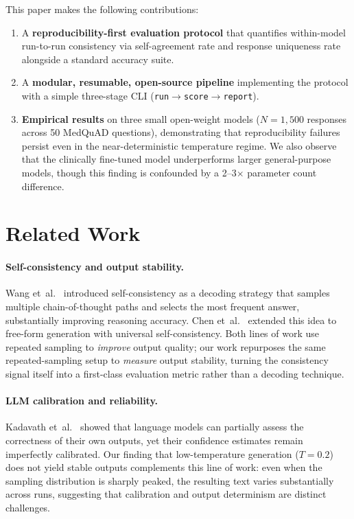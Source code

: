 \documentclass[11pt]{article}
\begin{document}
This paper makes the following contributions:
\begin{enumerate}
  \item A \textbf{reproducibility-first evaluation protocol} that
        quantifies within-model run-to-run consistency via
        self-agreement rate and response uniqueness rate alongside
        a standard accuracy suite.
  \item A \textbf{modular, resumable, open-source pipeline} implementing
        the protocol with a simple three-stage CLI
        (\texttt{run\;$\to$\;score\;$\to$\;report}).
  \item \textbf{Empirical results} on three small open-weight models
        ($N{=}1{,}500$ responses across 50 MedQuAD questions),
        demonstrating that reproducibility failures persist even in
        the near-deterministic temperature regime. We also observe that
        the clinically fine-tuned model underperforms larger
        general-purpose models, though this finding is confounded by
        a 2--3$\times$ parameter count difference.
\end{enumerate}

\section{Related Work}
\label{sec:related}

\paragraph{Self-consistency and output stability.}
Wang et~al.~\cite{wang2022selfconsistency} introduced self-consistency
as a decoding strategy that samples multiple chain-of-thought paths
and selects the most frequent answer, substantially improving reasoning
accuracy. Chen et~al.~\cite{chen2023universal} extended this idea to
free-form generation with universal self-consistency.
Both lines of work use repeated sampling to \emph{improve} output quality;
our work repurposes the same repeated-sampling setup to \emph{measure}
output stability, turning the consistency signal itself into a
first-class evaluation metric rather than a decoding technique.

\paragraph{LLM calibration and reliability.}
Kadavath et~al.~\cite{kadavath2022calibration} showed that language
models can partially assess the correctness of their own outputs, yet
their confidence estimates remain imperfectly calibrated.
Our finding that low-temperature generation ($T{=}0.2$) does not yield
stable outputs complements this line of work: even when the sampling
distribution is sharply peaked, the resulting text varies substantially
across runs, suggesting that calibration and output determinism are
distinct challenges.
\end{document}
